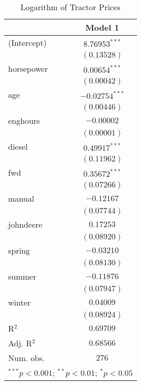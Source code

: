 
\begin{table}
\begin{center}
\begin{tabular}{l c}
\hline
 & Model 1 \\
\hline
(Intercept) & $8.76953^{***}$  \\
            & $(0.13528)$      \\
horsepower  & $0.00654^{***}$  \\
            & $(0.00042)$      \\
age         & $-0.02754^{***}$ \\
            & $(0.00446)$      \\
enghours    & $-0.00002$       \\
            & $(0.00001)$      \\
diesel      & $0.49917^{***}$  \\
            & $(0.11962)$      \\
fwd         & $0.35672^{***}$  \\
            & $(0.07266)$      \\
manual      & $-0.12167$       \\
            & $(0.07744)$      \\
johndeere   & $0.17253$        \\
            & $(0.08920)$      \\
spring      & $-0.03210$       \\
            & $(0.08130)$      \\
summer      & $-0.11876$       \\
            & $(0.07947)$      \\
winter      & $0.04009$        \\
            & $(0.08924)$      \\
\hline
R$^2$       & $0.69709$        \\
Adj. R$^2$  & $0.68566$        \\
Num. obs.   & $276$            \\
\hline
\multicolumn{2}{l}{\scriptsize{$^{***}p<0.001$; $^{**}p<0.01$; $^{*}p<0.05$}}
\end{tabular}
\caption{Logarithm of Tractor Prices}
\label{tab:log_price_reg_2}
\end{center}
\end{table}
